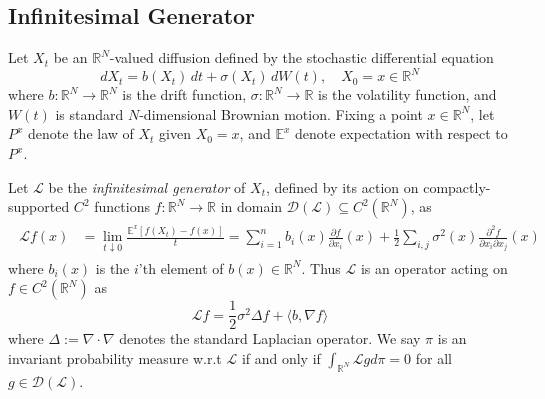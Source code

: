 \documentclass[journal,onecolumn]{IEEEtran}
\newtheorem{lemma}{Lemma}
\newcommand{\grad}{\nabla}
\newcommand{\reals}{\mathbb{R}}
\newcommand{\CE}{\mathbb{E}}
\newcommand{\brownt}{W(t)}
\newcommand{\dimn}{N}
\newcommand{\gen}{\mathcal{L}}
\newcommand{\del}{\partial}
\newcommand{\gendom}{\mathcal{D}(\gen)}
\begin{document}
{\subsection{Infinitesimal Generator}
 Let $X_t$ be an $\reals^{\dimn}$-valued diffusion defined by the stochastic differential equation
\begin{equation}
\label{eq:itodiff}
    dX_t = b(X_t)\, dt + \sigma(X_t)\, d\brownt, \quad X_0 = x \in \reals^{\dimn}
\end{equation}
where $b: \reals^{\dimn} \to \reals^{\dimn}$ is the drift function, $\sigma: \reals^{\dimn} \to \reals$ is the volatility function, and $\brownt$ is standard $\dimn$-dimensional Brownian motion. Fixing a point $x \in \reals^{\dimn}$, let $P^x$ denote the law of $X_t$ given $X_0 = x$, and $\CE^x$ denote expectation with respect to $P^x$. 

Let $\gen$ be the \textit{infinitesimal generator} of $X_t$, defined by its action on compactly-supported $C^2$ functions $f:\reals^{\dimn}\to\reals$ in domain $\gendom \subseteq C^2(\reals^{\dimn})$, as
\begin{align}
    \begin{split}
        \gen f(x) &= \lim_{t \downarrow 0}\frac{\CE^x[f(X_t) - f(x)]}{t} = \sum_{i=1}^n b_i(x) \frac{\del f}{\del x_i}(x) + \frac{1}{2}\sum_{i,j} \sigma^2(x) \frac{\del^2 f}{\del x_i \del x_j}(x)
    \end{split}
\end{align}
where $b_i(x)$ is the $i$'th element of $b(x) \in \reals^{\dimn}$. Thus $\gen$ is an operator acting on $f \in C^2(\reals^{\dimn})$ as \[\gen f = \frac{1}{2}\sigma^2 \Delta f+ \langle b, \grad f \rangle \]
where $\Delta := \grad \cdot \grad$ denotes the standard Laplacian operator. We say $\pi$ is an invariant probability measure w.r.t $\gen$ if and only if $\int_{\reals^{\dimn}}\gen g d\pi = 0$ for all $g \in \gendom$. 

}
\end{document}
